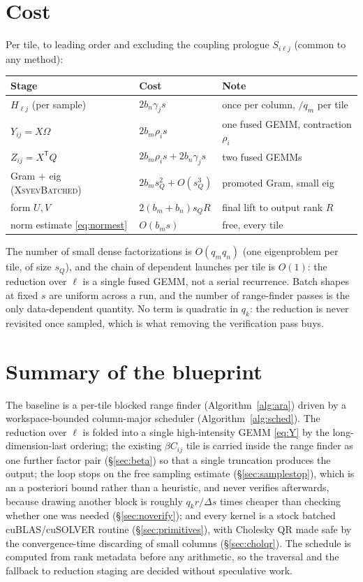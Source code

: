 \documentclass[11pt]{article}
\newcommand{\T}{\mathsf{T}}
\begin{document}
\section{Cost}
\label{sec:cost}

Per tile, to leading order and excluding the coupling prologue $S_{i\ell j}$
(common to any method):

\begin{center}
\begin{tabular}{lll}
\toprule
Stage & Cost & Note \\
\midrule
$H_{\ell j}$ (per sample)        & $2b_n\gamma_j s$ & once per column, $/q_m$ per tile \\
$Y_{ij}=X\Omega$                 & $2b_m\rho_i s$   & one fused GEMM, contraction $\rho_i$ \\
$Z_{ij}=X^{\T}Q$                 & $2b_m\rho_i s+2b_n\gamma_j s$ & two fused GEMMs \\
Gram $+$ eig (\textsc{XsyevBatched}) & $2b_ms_Q^2+O(s_Q^3)$ & promoted Gram, small eig \\
form $U,V$                       & $2(b_m+b_n)s_QR$ & final lift to output rank $R$ \\
norm estimate \eqref{eq:normest} & $O(b_ms)$ & free, every tile \\
\bottomrule
\end{tabular}
\end{center}

The number of small dense factorizations is $O(q_mq_n)$ (one eigenproblem per
tile, of size $s_Q$), and the chain of dependent launches per tile is $O(1)$:
the reduction over $\ell$ is a single fused GEMM, not a serial recurrence. Batch
shapes at fixed $s$ are uniform across a run, and the number of range-finder
passes is the only data-dependent quantity. No term is quadratic in $q_k$: the reduction is never
revisited once sampled, which is what removing the verification pass buys.

\section{Summary of the blueprint}
\label{sec:summary}

The baseline is a per-tile blocked range finder (Algorithm~\ref{alg:ara}) driven
by a workspace-bounded column-major scheduler (Algorithm~\ref{alg:sched}). The
reduction over $\ell$ is folded into a single high-intensity GEMM
\eqref{eq:Y} by the long-dimension-last ordering; the existing $\beta C_{ij}$
tile is carried inside the range finder as one further factor pair
(\S\ref{sec:beta}) so that a single truncation produces the output; the loop
stops on the free sampling estimate (\S\ref{sec:samplestop}), which is an a
posteriori bound rather than a heuristic, and never verifies afterwards, because
drawing another block is roughly $q_kr/\Delta s$ times cheaper than checking
whether one was needed (\S\ref{sec:noverify}); and every kernel is a
stock batched cuBLAS/cuSOLVER routine (\S\ref{sec:primitives}), with Cholesky QR
made safe by the convergence-time discarding of small columns
(\S\ref{sec:cholqr}). The schedule is computed from rank metadata before any
arithmetic, so the traversal and the fallback to reduction staging are decided
without speculative work.
\end{document}
